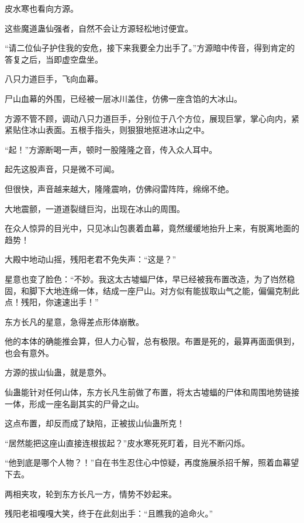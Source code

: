 \begin{this_body}
皮水寒也看向方源。

这些魔道蛊仙强者，自然不会让方源轻松地讨便宜。

“请二位仙子护住我的安危，接下来我要全力出手了。”方源暗中传音，得到肯定的答复之后，当即虚空盘坐。

八只力道巨手，飞向血幕。

尸山血幕的外围，已经被一层冰川盖住，仿佛一座含馅的大冰山。

方源不管不顾，调动八只力道巨手，分别位于八个方位，展现巨掌，掌心向内，紧紧贴住冰山表面。五根手指头，则狠狠地抠进冰山之中。

“起！”方源断喝一声，顿时一股隆隆之音，传入众人耳中。

起先这股声音，只是微不可闻。

但很快，声音越来越大，隆隆震响，仿佛闷雷阵阵，绵绵不绝。

大地震颤，一道道裂缝巨沟，出现在冰山的周围。

在众人惊异的目光中，只见冰山包裹着血幕，竟然缓缓地抬升上来，有脱离地面的趋势！

大殿中地动山摇，残阳老君不免失声：“这是？”

星意也变了脸色：“不妙。我这太古墟蝠尸体，早已经被我布置改造，为了岿然稳固，和脚下大地连绵一体，结成一座尸山。对方似有能拔取山气之能，偏偏克制此点！残阳，你速速出手！”

东方长凡的星意，急得差点形体崩散。

他的本体的确能推会算，但人力心智，总有极限。布置是死的，最算再面面俱到，也会有意外。

方源的拔山仙蛊，就是意外。

仙蛊能针对任何山体，东方长凡生前做了布置，将太古墟蝠的尸体和周围地势链接一体，形成一座名副其实的尸骨之山。

这点布置，却反而成了缺陷，正被拔山仙蛊所克！

“居然能把这座山直接连根拔起？”皮水寒死死盯着，目光不断闪烁。

“他到底是哪个人物？！”自在书生忍住心中惊疑，再度施展杀招千解，照着血幕望下去。

两相夹攻，轮到东方长凡一方，情势不妙起来。

残阳老祖嘎嘎大笑，终于在此刻出手：“且瞧我的追命火。”

\end{this_body}

